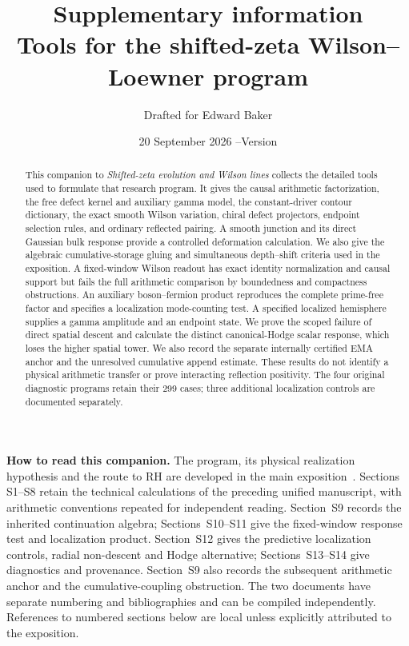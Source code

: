 \documentclass[11pt]{article}
\title{Supplementary information\\[3pt]
\large Tools for the shifted-zeta Wilson--Loewner program}
\author{Drafted for Edward Baker}
\date{20 September 2026 \quad--\quad Version \draftversion}
\begin{document}
\maketitle
\begin{abstract}
This companion to \emph{Shifted-zeta evolution and Wilson lines}
collects the detailed tools used to formulate that research program.
It gives the causal arithmetic factorization, the free defect kernel
and auxiliary gamma model, the constant-driver contour dictionary,
the exact smooth Wilson variation, chiral defect projectors, endpoint
selection rules, and ordinary reflected pairing. A smooth junction
and its direct Gaussian bulk response provide a controlled
deformation calculation. We also give the algebraic cumulative-storage
gluing and simultaneous depth--shift criteria used in the exposition.
A fixed-window Wilson readout has exact identity normalization and
causal support but fails the full arithmetic comparison by boundedness
and compactness obstructions. An auxiliary boson--fermion product
reproduces the complete prime-free factor and specifies a localization
mode-counting test. A specified localized hemisphere supplies a gamma
amplitude and an endpoint state. We prove the scoped failure of direct
spatial descent and calculate the distinct canonical-Hodge scalar response,
which loses the higher spatial tower. We also record the separate internally
certified EMA anchor and the unresolved cumulative append estimate.
These results do not identify a physical arithmetic transfer or prove
interacting reflection positivity. The four original diagnostic programs
retain their 299 cases; three additional localization controls are
documented separately.
\end{abstract}
\noindent\textbf{How to read this companion.}
The program, its physical realization hypothesis and the route to RH
are developed in the main exposition~\cite{Exposition}. Sections
S1--S8 retain the technical calculations of the preceding unified
manuscript, with arithmetic conventions repeated for independent
reading. Section~S9 records the inherited continuation algebra;
Sections~S10--S11 give the fixed-window response test and localization
product. Section~S12 gives the predictive localization controls, radial
non-descent and Hodge alternative; Sections~S13--S14 give diagnostics
and provenance. Section~S9 also records the subsequent arithmetic anchor
and the cumulative-coupling obstruction.
The two documents have separate
numbering and bibliographies and can be compiled independently.
References to numbered sections below are local unless explicitly
attributed to the exposition.
\tableofcontents















\end{document}
